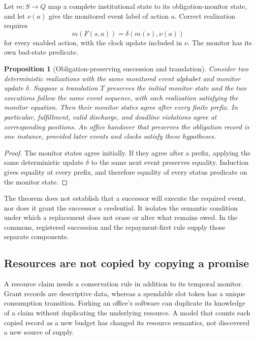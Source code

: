 \documentclass[11pt,letterpaper]{article}
\theoremstyle{plain}
\newtheorem{proposition}{Proposition}[section]
\theoremstyle{definition}
\theoremstyle{remark}
\begin{document}
Let $m:S\to Q$ map a complete institutional state to its obligation-monitor state, and let $\nu(a)$ give the monitored event label of action $a$. Correct realization requires
\[
m(F(s,a))=\delta(m(s),\nu(a))
\]
for every enabled action, with the clock update included in $\nu$. The monitor has its own bad-state predicate.

\begin{proposition}[Obligation-preserving succession and translation]\label{prop:obligationtransport}
Consider two deterministic realizations with the same monitored event alphabet and monitor update $\delta$. Suppose a translation $T$ preserves the initial monitor state and the two executions follow the same event sequence, with each realization satisfying the monitor equation. Then their monitor states agree after every finite prefix. In particular, fulfillment, valid discharge, and deadline violations agree at corresponding positions. An office handover that preserves the obligation record is one instance, provided later events and clocks satisfy these hypotheses.
\end{proposition}
\begin{proof}
The monitor states agree initially. If they agree after a prefix, applying the same deterministic update $\delta$ to the same next event preserves equality. Induction gives equality at every prefix, and therefore equality of every status predicate on the monitor state.
\end{proof}

The theorem does not establish that a successor will execute the required event, nor does it grant the successor a credential. It isolates the semantic condition under which a replacement does not erase or alter what remains owed. In the commons, registered succession and the repayment-first rule supply those separate components.

\subsection{Resources are not copied by copying a promise}
A resource claim needs a conservation rule in addition to its temporal monitor. Grant records are descriptive data, whereas a spendable slot token has a unique consumption transition. Forking an office's software can duplicate its knowledge of a claim without duplicating the underlying resource. A model that counts each copied record as a new budget has changed its resource semantics, not discovered a new source of supply.
\end{document}
